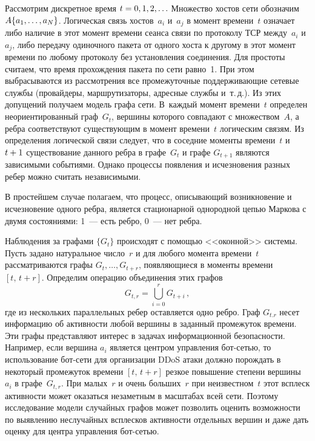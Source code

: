 \begin{multicols}{2}
     Рассмотрим дискретное время $t \hm= 0, 1, 2, \ldots$ Множество хостов сети 
обозначим $A\hm \{a_1, \ldots , a_N\}$. Логическая связь хостов~$a_i$ и~$a_j$ в момент 
времени~$t$ означает либо наличие в этот момент времени сеанса связи по протоколу 
ТСР между~$a_i$ и~$a_j$, либо передачу одиночного пакета от одного хоста к другому в 
этот момент времени по любому протоколу без установления соединения. Для простоты 
считаем, что время прохождения пакета по сети равно~1. При этом выбрасываются из 
рассмотрения все промежуточные поддерживающие сетевые службы (провайдеры, 
маршрутизаторы, адресные службы и~т.\,д.). Из этих допущений получаем модель графа 
сети. В~каждый момент времени~$t$ определен неориентированный граф~$G_t$, 
вершины которого совпадают с множеством~$A$, а ребра соответствуют существующим 
в момент времени~$t$ логическим связям. Из определения логической связи следует, что 
в соседние моменты времени~$t$ и $t\hm+1$ существование данного ребра в графе~$G_t$ 
и графе $G_{t+1}$ являются зависимыми событиями. Однако процессы появления и 
исчезновения разных ребер можно считать независимыми. 
     
     В простейшем случае полагаем, что процесс, описывающий возникновение и 
исчезновение одного ребра, является стационарной однородной \mbox{цепью} Маркова с двумя 
состояниями: 1~--- есть ребро, 0~--- нет ребра. 
     
     Наблюдения за графами $\{G_t\}$ происходят с помощью <<оконной>> системы. 
Пусть задано натуральное число~$r$ и для любого момента времени~$t$ рассматриваются 
графы $G_t, \ldots , G_{t+r}$, появляющиеся в моменты времени $[t,\,t+r]$. Определим 
операцию объединения этих графов
     $$
     G_{t,r}=\bigcup\limits_{i=0}^r G_{t+i}\,,
     $$
где из нескольких параллельных ребер оставляется одно ребро. Граф $G_{t.r}$ несет 
информацию об активности любой вершины в заданный промежуток времени. Эти графы 
представляют интерес в задачах информационной безопасности. Например, если вершина 
$a_i$ является центром управления бот-сетью, то использование бот-сети для организации 
DDoS атаки должно порождать в некоторый промежуток времени $[t,\,t+r]$ резкое 
повышение степени вершины~$a_i$ в графе~$G_{t,r}$. При малых~$r$ и очень 
больших~$r$ при неизвестном~$t$ этот всплеск активности может оказаться незаметным 
в масштабах всей сети. Поэтому исследование модели случайных графов может позволить 
оценить возможности по выявлению неслучайных всплесков активности отдельных 
вершин и даже дать оценку для центра управления бот-сетью. 


\end{multicols}
